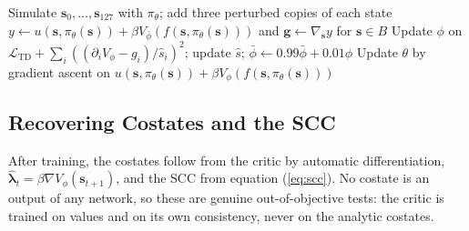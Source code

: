 \begin{algorithm}[ht]
\caption{Model-based actor-critic with value-gradient learning}
\label{alg:ac}
\begin{algorithmic}[1]
    \State Simulate \(\bm{s}_0, \dots, \bm{s}_{127}\) with \(\pi_\theta\); add three perturbed copies of each state
        \State \(y \gets u(\bm{s}, \pi_\theta(\bm{s})) + \beta V_{\bar\phi}(f(\bm{s}, \pi_\theta(\bm{s})))\) and \(\bm{g} \gets \nabla_{\bm{s}} y\) for \(\bm{s} \in B\)
        \State Update \(\phi\) on \(\mathcal{L}_{\text{TD}} + \sum_i ((\partial_i V_\phi - g_i)/\hat{s}_i)^2\); update \(\hat{s}\); \(\bar\phi \gets 0.99\bar\phi + 0.01\phi\)
            \State Update \(\theta\) by gradient ascent on \(u(\bm{s}, \pi_\theta(\bm{s})) + \beta V_\phi(f(\bm{s}, \pi_\theta(\bm{s})))\)
        \EndIf
    \EndFor
\EndFor
\end{algorithmic}
\end{algorithm}

\subsection{Recovering Costates and the SCC}

After training, the costates follow from the critic by automatic differentiation, \(\hat{\bm{\lambda}}_t = \beta\nabla V_\phi(\bm{s}_{t+1})\), and the SCC from equation (\ref{eq:scc}). No costate is an output of any network, so these are genuine out-of-objective tests: the critic is trained on values and on its own consistency, never on the analytic costates.
